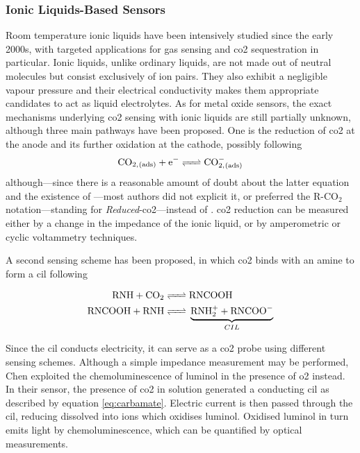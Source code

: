 \subsubsection{Ionic Liquids-Based Sensors}\label{subsect:choos:review:ionic_liquids}

Room temperature ionic liquids have been intensively studied since the early 2000s, with targeted applications for gas sensing and \gls{co2} sequestration in particular\cite{barrosse2010, rehman2015, behera2015, wasilewski2020}. Ionic liquids, unlike ordinary liquids, are not made out of neutral molecules but consist exclusively of ion pairs. They also exhibit a negligible vapour pressure and their electrical conductivity makes them appropriate candidates to act as liquid electrolytes. As for metal oxide sensors, the exact mechanisms underlying \gls{co2} sensing with ionic liquids are still partially unknown, although three main pathways have been proposed. One is the reduction of \gls{co2} at the anode and its further oxidation at the cathode, possibly following\cite{fapyane2020}
\begin{equation}
	\ce{CO_{2,(ads)} + e^- <=> CO^-_{2,(ads)}}
\end{equation}
although---since there is a reasonable amount of doubt about the latter equation and the existence of ---most authors did not explicit it, or preferred the R-CO$_2$ notation---standing for \emph{Reduced}-\gls{co2}---instead of \cite{rosen2010}. \gls{co2} reduction can be measured either by a change in the impedance of the ionic liquid\cite{li2012, honda2012, ishizu2013, willa2015, willa2017}, or by amperometric or cyclic voltammetry techniques\cite{rosen2010, fapyane2020, revsbech2019}.

A second sensing scheme has been proposed, in which \gls{co2} binds with an amine to form a \gls{cil} following\cite{chen2011}

\begin{equation}\label{eq:carbamate}
	\begin{aligned}
		\ce{RNH + CO_2 &<=> RNCOOH} \\
		\ce{RNCOOH + RNH} &\ce{<=>} \underbrace{\ce{RNH^+_2 + RNCOO^-}}_{CIL}
	\end{aligned}
\end{equation}

Since the \gls{cil} conducts electricity, it can serve as a \gls{co2} probe using different sensing schemes. Although a simple impedance measurement may be performed, Chen \etal{}\cite{chen2011} exploited the chemoluminescence of luminol in the presence of \gls{o2} instead. In their sensor, the presence of \gls{co2} in solution generated a conducting \gls{cil} as described by equation \ref{eq:carbamate}. Electric current is then passed through the \gls{cil}, reducing dissolved  into  ions which oxidises luminol. Oxidised luminol in turn emits light by chemoluminescence, which can be quantified by optical measurements.


